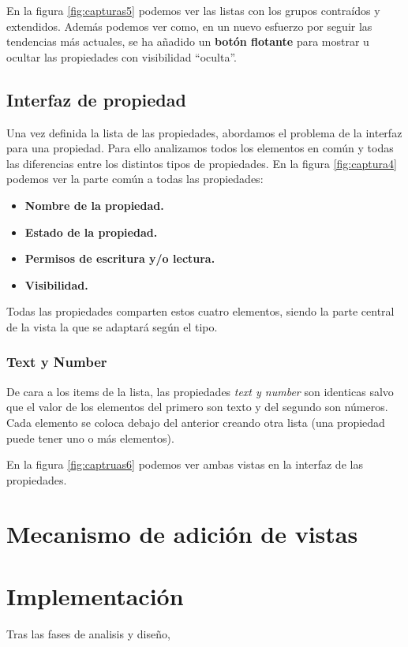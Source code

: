 En la figura \ref{fig:capturas5} podemos ver las listas con los grupos contraídos y extendidos. Además podemos ver como, en un nuevo esfuerzo por seguir las tendencias más actuales, se ha añadido un \textbf{botón flotante} para mostrar u ocultar las propiedades con visibilidad ``oculta''.


\bigskip
\subsection{Interfaz de propiedad}
Una vez definida la lista de las propiedades, abordamos el problema de la interfaz para una propiedad. Para ello analizamos todos los elementos en común y todas las diferencias entre los distintos tipos de propiedades. En la figura \ref{fig:captura4} podemos ver la parte común a todas las propiedades:

\begin{itemize}
  \item \textbf{Nombre de la propiedad.}
  \item \textbf{Estado de la propiedad.}
  \item \textbf{Permisos de escritura y/o lectura.}
  \item \textbf{Visibilidad.}
\end{itemize}

Todas las propiedades comparten estos cuatro elementos, siendo la parte central de la vista la que se adaptará según el tipo.

\bigskip
\subsubsection{Text y Number}

De cara a los items de la lista, las propiedades \textit{text y number} son identicas salvo que el valor de los elementos del primero son texto y del segundo son números. Cada elemento se coloca debajo del anterior creando otra lista (una propiedad puede tener uno o más elementos).

En la figura \ref{fig:captruas6} podemos ver ambas vistas en la interfaz de las propiedades. 


\bigskip
\section{Mecanismo de adición de vistas}

\bigskip
\section{Implementación}

Tras las fases de analisis y diseño, 